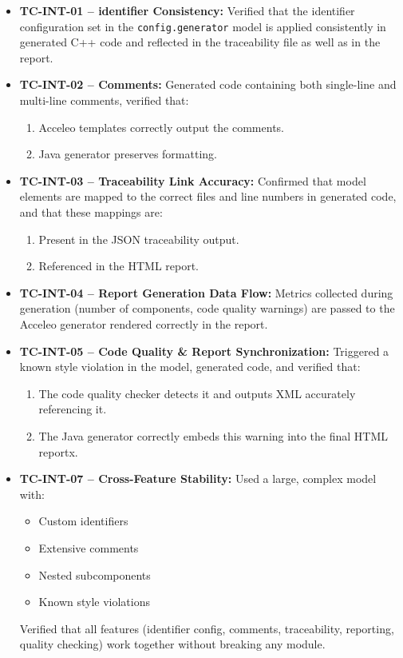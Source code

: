 \begin{itemize}
	\item \textbf{TC-INT-01 – \Gls{identifier} Consistency:} Verified that the \gls{identifier} configuration set in the \texttt{config.generator} model is applied consistently in generated C++ code and reflected in the traceability file as well as in the report.
	
	\item \textbf{TC-INT-02 – Comments:} Generated code containing both single-line and multi-line comments, verified that:
	\begin{enumerate}
		\item Acceleo templates correctly output the comments.
		\item Java generator preserves formatting.
	\end{enumerate}
	
	\item \textbf{TC-INT-03 – Traceability Link Accuracy:} Confirmed that model elements are mapped to the correct files and line numbers in generated code, and that these mappings are:
	\begin{enumerate}
		\item Present in the \gls{JSON} traceability output.
		\item Referenced in the \gls{HTML} report.
	\end{enumerate}
	
	\item \textbf{TC-INT-04 – Report Generation Data Flow:} Metrics collected during generation (number of components, code quality warnings) are passed to the Acceleo generator rendered correctly in the report.
	
	\item \textbf{TC-INT-05 – Code Quality \& Report Synchronization:} Triggered a known style violation in the model, generated code, and verified that:
	\begin{enumerate}
		\item The code quality checker detects it and outputs XML accurately referencing it.
		\item The Java generator correctly embeds this warning into the final HTML reportx.
	\end{enumerate}
	
	\item \textbf{TC-INT-07 – Cross-Feature Stability:} Used a large, complex model with:
	\begin{itemize}
		\item Custom \glspl{identifier}
		\item Extensive comments
		\item Nested subcomponents
		\item Known style violations
	\end{itemize}
	Verified that all features (\gls{identifier} config, comments, traceability, reporting, quality checking) work together without breaking any module.
\end{itemize}



